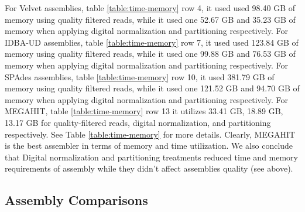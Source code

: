 For Velvet assemblies, table \ref{table:time-memory} row 4, it used used 98.40 GB of memory using quality
filtered reads, while it used one 52.67 GB and 35.23 GB of memory when
applying digital normalization and partitioning respectively. For IDBA-UD
assemblies, table \ref{table:time-memory} row 7, it used used 123.84 GB of memory using quality filtered
reads, while it used one 99.88 GB and 76.53 GB of memory when applying
digital normalization and partitioning respectively. For SPAdes
assemblies, table \ref{table:time-memory} row 10, it used 381.79 GB of memory using quality filtered reads,
while it used one 121.52 GB and 94.70 GB of memory when applying
digital normalization and partitioning respectively.  For MEGAHIT, table \ref{table:time-memory} row 13 it
utilizes 33.41 GB, 18.89 GB, 13.17 GB for quality-filtered reads,
digital normalization, and partitioning respectively. See Table
\ref{table:time-memory} for more details. Clearly, MEGAHIT is the
best assembler in terms of memory and time utilization. We also
conclude that Digital normalization and partitioning treatments
reduced time and memory requirements of assembly while they didn't
affect assemblies quality (see above).

 



\subsection*{Assembly Comparisons}


